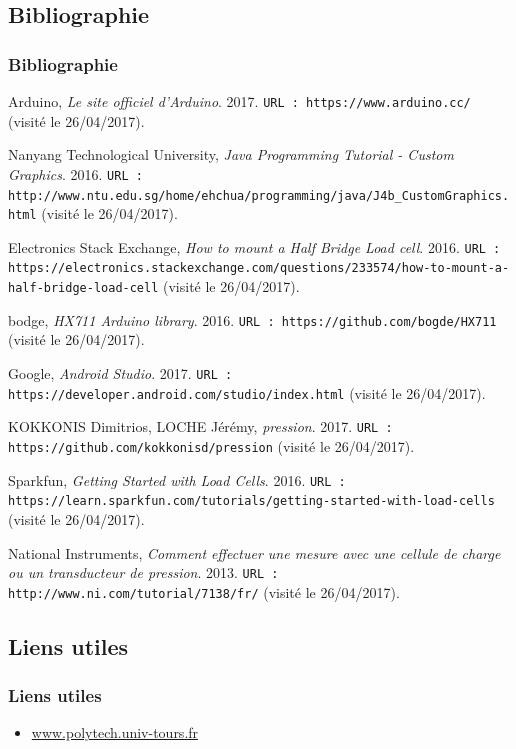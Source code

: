 \documentclass{beamer}
\begin{document}
\subsection*{Bibliographie}
\begin{frame}
\frametitle{Bibliographie}
\begin{thebibliography}{99}
{\tiny {} Arduino, \textit{Le site officiel d'Arduino}. 2017. \texttt{\tiny URL : https://www.arduino.cc/} (visité le 26/04/2017).

 Nanyang Technological University, \textit{Java Programming Tutorial - Custom Graphics}. 2016. \texttt{\tiny URL : http://www.ntu.edu.sg/home/ehchua/programming/java/J4b\_CustomGraphics.html} (visité le 26/04/2017).

 Electronics Stack Exchange, \textit{How to mount a Half Bridge Load cell}. 2016. \texttt{\tiny URL : https://electronics.stackexchange.com/questions/233574/how-to-mount-a-half-bridge-load-cell} (visité le 26/04/2017).

 bodge, \textit{HX711 Arduino library}. 2016. \texttt{\tiny URL : https://github.com/bogde/HX711} (visité le 26/04/2017).

 Google, \textit{Android Studio}. 2017. \texttt{\tiny URL : https://developer.android.com/studio/index.html} (visité le 26/04/2017).

 KOKKONIS Dimitrios, LOCHE Jérémy, \textit{pression}. 2017. \texttt{\tiny URL : https://github.com/kokkonisd/pression} (visité le 26/04/2017).

 Sparkfun, \textit{Getting Started with Load Cells}. 2016. \texttt{\tiny URL : https://learn.sparkfun.com/tutorials/getting-started-with-load-cells} (visité le 26/04/2017).

 National Instruments, \textit{Comment effectuer une mesure avec une cellule de charge ou un transducteur de pression}. 2013. \texttt{\tiny URL : http://www.ni.com/tutorial/7138/fr/} (visité le 26/04/2017).}
\end{thebibliography}
\end{frame}

\subsection*{Liens utiles}
\begin{frame}
\frametitle{Liens utiles}
\begin{itemize}
\item \url{www.polytech.univ-tours.fr}
\end{itemize}
\end{frame}
\end{document}
